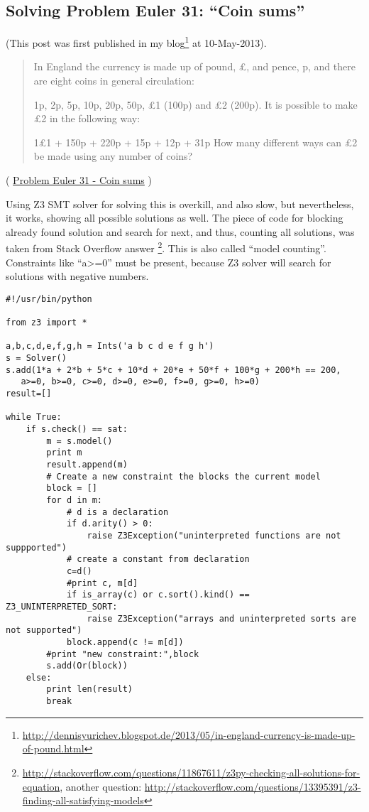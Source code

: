 \subsection{Solving Problem Euler 31: ``Coin sums''}

(This post was first published in my blog\footnote{\url{http://dennisyurichev.blogspot.de/2013/05/in-england-currency-is-made-up-of-pound.html}} at 10-May-2013).

\begin{framed}
\begin{quotation}
In England the currency is made up of pound, £, and pence, p, and there are eight coins in general circulation:

1p, 2p, 5p, 10p, 20p, 50p, £1 (100p) and £2 (200p).
It is possible to make £2 in the following way:

1£1 + 150p + 220p + 15p + 12p + 31p
How many different ways can £2 be made using any number of coins?
\end{quotation}
\end{framed}
( \href{http://projecteuler.net/problem=31}{Problem Euler 31 - Coin sums} )

\label{SMTEnumerate}
Using Z3 \ac{SMT} solver for solving this is overkill, and also slow, but nevertheless, it works, showing all possible solutions as well.
The piece of code for blocking already found solution and search for next, and thus, counting all solutions, was taken from Stack Overflow answer
\footnote{\url{http://stackoverflow.com/questions/11867611/z3py-checking-all-solutions-for-equation}, 
another question: \url{http://stackoverflow.com/questions/13395391/z3-finding-all-satisfying-models}}.
This is also called ``model counting''.
Constraints like ``a>=0'' must be present, because Z3 solver will search for solutions with negative numbers.

\begin{lstlisting}
#!/usr/bin/python

from z3 import *

a,b,c,d,e,f,g,h = Ints('a b c d e f g h')
s = Solver()
s.add(1*a + 2*b + 5*c + 10*d + 20*e + 50*f + 100*g + 200*h == 200, 
   a>=0, b>=0, c>=0, d>=0, e>=0, f>=0, g>=0, h>=0)
result=[]

while True:
    if s.check() == sat:
        m = s.model()
        print m
        result.append(m)
        # Create a new constraint the blocks the current model
        block = []
        for d in m:
            # d is a declaration
            if d.arity() > 0:
                raise Z3Exception("uninterpreted functions are not suppported")
            # create a constant from declaration
            c=d()
            #print c, m[d]
            if is_array(c) or c.sort().kind() == Z3_UNINTERPRETED_SORT:
                raise Z3Exception("arrays and uninterpreted sorts are not supported")
            block.append(c != m[d])
        #print "new constraint:",block
        s.add(Or(block))
    else:
        print len(result)
        break
\end{lstlisting}

